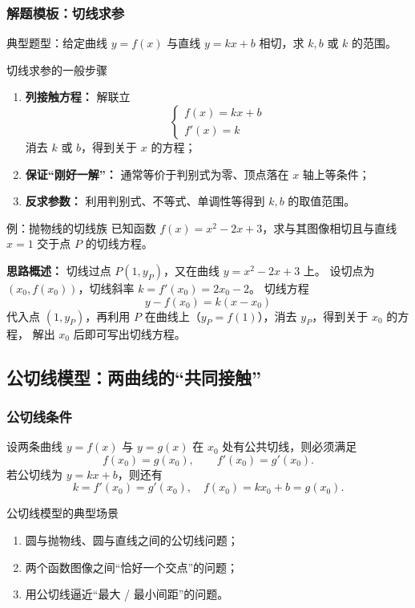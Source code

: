 \documentclass[a4paper,11pt]{ctexart}
\begin{document}
\subsubsection{解题模板：切线求参}

典型题型：给定曲线 $y=f(x)$ 与直线 $y=kx+b$ 相切，求 $k,b$ 或 $k$ 的范围。

\begin{summarybox}{切线求参的一般步骤}
  \begin{enumerate}
    \item \textbf{列接触方程：} 解联立
      \[
        \begin{cases}
          f(x)=kx+b\\
          f'(x)=k
        \end{cases}
      \]
      消去 $k$ 或 $b$，得到关于 $x$ 的方程；
    \item \textbf{保证“刚好一解”：} 通常等价于判别式为零、顶点落在 $x$ 轴上等条件；
    \item \textbf{反求参数：} 利用判别式、不等式、单调性等得到 $k,b$ 的取值范围。
  \end{enumerate}
\end{summarybox}

\begin{examplebox}[mathnote coverage=soft]{例：抛物线的切线族}
  已知函数 $f(x)=x^2-2x+3$，求与其图像相切且与直线 $x=1$ 交于点 $P$ 的切线方程。
\end{examplebox}

\textbf{思路概述：}
切线过点 $P(1,y_P)$，又在曲线 $y=x^2-2x+3$ 上。
设切点为 $(x_0,f(x_0))$，切线斜率 $k=f'(x_0)=2x_0-2$。
切线方程
\[
  y-f(x_0)=k(x-x_0)
\]
代入点 $(1,y_P)$，再利用 $P$ 在曲线上（$y_P=f(1)$），消去 $y_P$，得到关于 $x_0$ 的方程，
解出 $x_0$ 后即可写出切线方程。

\subsection{公切线模型：两曲线的“共同接触”}

\subsubsection{公切线条件}

设两条曲线 $y=f(x)$ 与 $y=g(x)$ 在 $x_0$ 处有公共切线，则必须满足
\[
  f(x_0)=g(x_0),\qquad f'(x_0)=g'(x_0).
\]
若公切线为 $y=kx+b$，则还有
\[
  k=f'(x_0)=g'(x_0),\quad f(x_0)=kx_0+b=g(x_0).
\]

\begin{conceptbox}{公切线模型的典型场景}
  \begin{enumerate}
    \item 圆与抛物线、圆与直线之间的公切线问题；
    \item 两个函数图像之间“恰好一个交点”的问题；
    \item 用公切线逼近“最大 / 最小间距”的问题。
  \end{enumerate}
\end{conceptbox}
\end{document}
